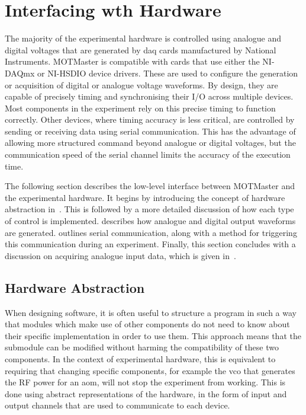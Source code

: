 \section{Interfacing wth Hardware}\label{sec:mm_interface}

The majority of the experimental hardware is controlled using analogue and
digital voltages that are generated by \ac{daq} cards manufactured by
National Instruments. MOTMaster is compatible with cards that use either the
NI-DAQmx or NI-HSDIO device drivers. These are used to configure the
generation or acquisition of digital or analogue voltage waveforms. By design, they are
capable of precisely timing and synchronising their I/O across multiple
devices. Most components in the experiment rely on this precise timing to
function correctly. Other devices, where timing accuracy is less critical,
are controlled by sending or receiving data using serial communication. This
has the advantage of allowing more structured command beyond analogue or
digital voltages, but the communication speed of the serial channel limits
the accuracy of the execution time. \par\noindent
The following section describes the low-level interface between MOTMaster and the experimental hardware. It begins by introducing the concept of hardware abstraction in~. This is followed by a more detailed discussion of how each type of control is implemented.  describes how analogue and digital output waveforms are generated.  outlines serial communication, along with a method for triggering this communication during an experiment. Finally, this section concludes with a discussion on acquiring analogue input data, which is given in~.

\subsection{Hardware Abstraction}\label{subsec:compinterface_hwabstraction}
When designing software, it is often useful to structure a program in such a
way that modules which make use of other components do not need to know about
their specific implementation in order to use them. This approach means that the submodule can be modified without harming the
compatibility of these two components. In the context of experimental
hardware, this is equivalent to requiring that changing specific components,
for example the \ac{vco} that generates the RF power for an \ac{aom}, will
not stop the experiment from working. This is done using abstract
representations of the hardware, in the form of input and output channels
that are used to communicate to each device. 
